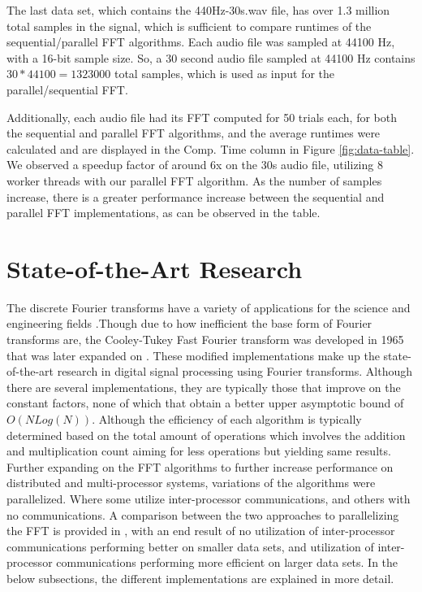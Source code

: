 \documentclass[journal]{IEEEtran}
\begin{document}
	\vspace{1em}
	\par{
		The last data set, which contains the 440Hz-30s.wav file, has over
		1.3 million total samples in the signal, which is sufficient
		to compare runtimes of the sequential/parallel FFT algorithms. Each
		audio file was sampled at 44100 Hz, with a 16-bit sample size. So, a 30
		second audio file sampled at 44100 Hz contains $30 * 44100 = 1323000$
		total samples, which is used as input for the parallel/sequential FFT.
	}
	\par{
		Additionally, each audio file had its FFT computed for 50 trials each, 
		for both the sequential and parallel FFT algorithms, and the 
		average runtimes were calculated and are displayed in the Comp. Time 
		column in Figure \ref{fig:data-table}. We observed a speedup factor of 
		around 6x on the 30s audio file, utilizing 8 worker threads with our 
		parallel FFT algorithm. As the number of samples increase, 
		there is a greater performance increase between the sequential and 
		parallel FFT implementations, as can be observed in the table.
	}

\section{State-of-the-Art Research}


	\par {
		The discrete Fourier transforms have a variety of applications for the 
		science and engineering fields \cite{Xiang}.Though due to how inefficient 
		the base form of Fourier transforms are, the Cooley-Tukey Fast Fourier transform 
		was developed in 1965 that was later expanded on \cite{CTA}. These modified implementations 
		make up the state-of-the-art research in digital signal processing using Fourier transforms. 
		Although there are several implementations, they are typically those that improve on the constant 
		factors, none of which that obtain a better upper asymptotic bound of ${O(N Log(N))}$. Although 
		the efficiency of each algorithm is typically determined based on the total amount of operations which 
		involves the addition and multiplication count aiming for less operations but yielding same results. 
		Further expanding on the FFT algorithms to further increase performance on distributed and multi-processor systems, variations of the algorithms 
		were parallelized. Where some utilize inter-processor communications, and others with no communications. 
		A comparison between the two approaches to parallelizing the FFT is provided in \cite{Pan}, with an 
		end result of no utilization of inter-processor communications performing better on smaller data sets, and utilization of inter-processor communications 
		performing more efficient on larger data sets. In the below subsections, the different implementations 
		are explained in more detail.
	}
\end{document}
